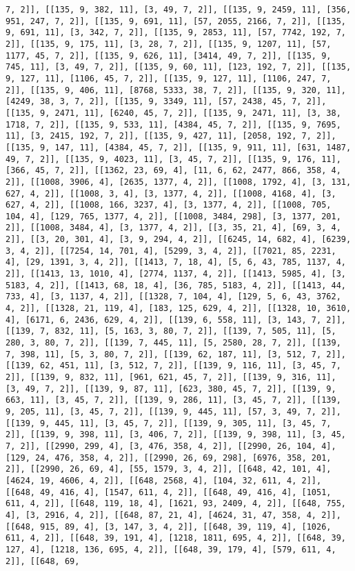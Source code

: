 \documentclass[12pt,fleqn]{article}\usepackage{../../common}
\begin{document}
\begin{verbatim}
7, 2]], [[135, 9, 382, 11], [3, 49, 7, 2]], [[135, 9, 2459, 11], [356, 951, 247, 7, 2]], [[135, 9, 691, 11], [57, 2055, 2166, 7, 2]], [[135, 9, 691, 11], [3, 342, 7, 2]], [[135, 9, 2853, 11], [57, 7742, 192, 7, 2]], [[135, 9, 175, 11], [3, 28, 7, 2]], [[135, 9, 1207, 11], [57, 1177, 45, 7, 2]], [[135, 9, 626, 11], [3414, 49, 7, 2]], [[135, 9, 745, 11], [3, 49, 7, 2]], [[135, 9, 60, 11], [123, 192, 7, 2]], [[135, 9, 127, 11], [1106, 45, 7, 2]], [[135, 9, 127, 11], [1106, 247, 7, 2]], [[135, 9, 406, 11], [8768, 5333, 38, 7, 2]], [[135, 9, 320, 11], [4249, 38, 3, 7, 2]], [[135, 9, 3349, 11], [57, 2438, 45, 7, 2]], [[135, 9, 2471, 11], [6240, 45, 7, 2]], [[135, 9, 2471, 11], [3, 38, 1718, 7, 2]], [[135, 9, 533, 11], [4384, 45, 7, 2]], [[135, 9, 7695, 11], [3, 2415, 192, 7, 2]], [[135, 9, 427, 11], [2058, 192, 7, 2]], [[135, 9, 147, 11], [4384, 45, 7, 2]], [[135, 9, 911, 11], [631, 1487, 49, 7, 2]], [[135, 9, 4023, 11], [3, 45, 7, 2]], [[135, 9, 176, 11], [366, 45, 7, 2]], [[1362, 23, 69, 4], [11, 6, 62, 2477, 866, 358, 4, 2]], [[1008, 3906, 4], [2635, 1377, 4, 2]], [[1008, 1792, 4], [3, 131, 627, 4, 2]], [[1008, 3, 4], [3, 1377, 4, 2]], [[1008, 4168, 4], [3, 627, 4, 2]], [[1008, 166, 3237, 4], [3, 1377, 4, 2]], [[1008, 705, 104, 4], [129, 765, 1377, 4, 2]], [[1008, 3484, 298], [3, 1377, 201, 2]], [[1008, 3484, 4], [3, 1377, 4, 2]], [[3, 35, 21, 4], [69, 3, 4, 2]], [[3, 20, 301, 4], [3, 9, 294, 4, 2]], [[6245, 14, 682, 4], [6239, 3, 4, 2]], [[7254, 14, 701, 4], [5299, 3, 4, 2]], [[7021, 85, 2231, 4], [29, 1391, 3, 4, 2]], [[1413, 7, 18, 4], [5, 6, 43, 785, 1137, 4, 2]], [[1413, 13, 1010, 4], [2774, 1137, 4, 2]], [[1413, 5985, 4], [3, 5183, 4, 2]], [[1413, 68, 18, 4], [36, 785, 5183, 4, 2]], [[1413, 44, 733, 4], [3, 1137, 4, 2]], [[1328, 7, 104, 4], [129, 5, 6, 43, 3762, 4, 2]], [[1328, 21, 119, 4], [183, 125, 629, 4, 2]], [[1328, 10, 3610, 4], [6171, 6, 2436, 629, 4, 2]], [[139, 6, 558, 11], [3, 143, 7, 2]], [[139, 7, 832, 11], [5, 163, 3, 80, 7, 2]], [[139, 7, 505, 11], [5, 280, 3, 80, 7, 2]], [[139, 7, 445, 11], [5, 2580, 28, 7, 2]], [[139, 7, 398, 11], [5, 3, 80, 7, 2]], [[139, 62, 187, 11], [3, 512, 7, 2]], [[139, 62, 451, 11], [3, 512, 7, 2]], [[139, 9, 116, 11], [3, 45, 7, 2]], [[139, 9, 832, 11], [961, 621, 45, 7, 2]], [[139, 9, 316, 11], [3, 49, 7, 2]], [[139, 9, 87, 11], [623, 380, 45, 7, 2]], [[139, 9, 663, 11], [3, 45, 7, 2]], [[139, 9, 286, 11], [3, 45, 7, 2]], [[139, 9, 205, 11], [3, 45, 7, 2]], [[139, 9, 445, 11], [57, 3, 49, 7, 2]], [[139, 9, 445, 11], [3, 45, 7, 2]], [[139, 9, 305, 11], [3, 45, 7, 2]], [[139, 9, 398, 11], [3, 406, 7, 2]], [[139, 9, 398, 11], [3, 45, 7, 2]], [[2990, 299, 4], [3, 476, 358, 4, 2]], [[2990, 26, 104, 4], [129, 24, 476, 358, 4, 2]], [[2990, 26, 69, 298], [6976, 358, 201, 2]], [[2990, 26, 69, 4], [55, 1579, 3, 4, 2]], [[648, 42, 101, 4], [4624, 19, 4606, 4, 2]], [[648, 2568, 4], [104, 32, 611, 4, 2]], [[648, 49, 416, 4], [1547, 611, 4, 2]], [[648, 49, 416, 4], [1051, 611, 4, 2]], [[648, 119, 18, 4], [1621, 93, 2409, 4, 2]], [[648, 755, 4], [3, 2916, 4, 2]], [[648, 87, 21, 4], [4624, 31, 47, 358, 4, 2]], [[648, 915, 89, 4], [3, 147, 3, 4, 2]], [[648, 39, 119, 4], [1026, 611, 4, 2]], [[648, 39, 191, 4], [1218, 1811, 695, 4, 2]], [[648, 39, 127, 4], [1218, 136, 695, 4, 2]], [[648, 39, 179, 4], [579, 611, 4, 2]], [[648, 69, 
\end{verbatim}
\end{document}
